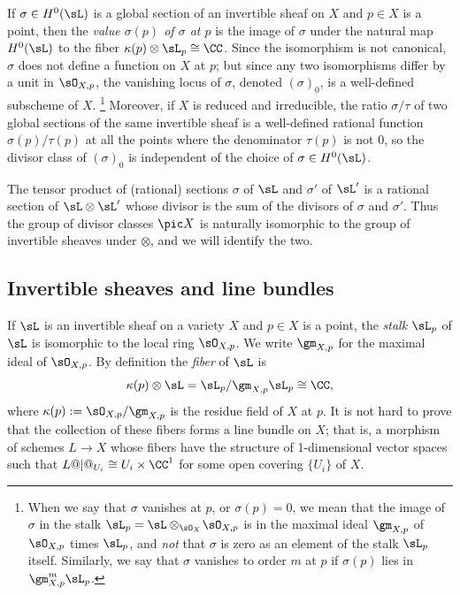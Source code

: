 If $\sigma\in H^0(\sL)$ is a global section of an invertible sheaf on
%
$X$ and $p\in X$ is a point, then the 
\emph{value $\sigma(p)$ of $\sigma$ at $p$}
is the image  of $\sigma$ under the natural map
$H^0(\sL)$ to the fiber $\kappa(p) \otimes \sL_{p} \cong \CC$. 
Since the isomorphism is not canonical, $\sigma$ does not define a function on $X$ at $p$; but since any two isomorphisms
differ by a unit in $\sO_{X,p}$, the vanishing locus of $\sigma$,
denoted $(\sigma)_0$, is a well-defined subscheme of $X$.%
%
\footnote{
When we  say that 
$\sigma$ vanishes at $p$,
or $\sigma(p) = 0$, we mean that the 
image of $\sigma$ in the stalk $\sL_p = \sL \otimes_{\sO_{X}}\!\sO_{X,p}$ is in
the maximal ideal $\gm_{X,p}$ of $\sO_{X,p}$ times $\sL_p$,
and \emph{not} that $\sigma$ is zero
as an element of the stalk $\sL_p$ itself. Similarly, we say that $\sigma$ vanishes to order $m$ at $p$ if $\sigma(p)$ lies in $\gm_{X,p}^m\sL_p$. }
%
 Moreover, if $X$ is reduced and irreducible, 
the ratio $\sigma/\tau$ of two global sections
 of the same invertible sheaf is a well-defined rational function
$\sigma(p)/\tau(p)$ at all the points where the denominator $\tau(p)$ is not 0, so the divisor class of 
$(\sigma)_0$ is independent of the choice of $\sigma \in H^0(\sL)$.

The tensor product of (rational) sections $\sigma$ of $\sL$ and $\sigma'$
of $\sL'$ is a rational section of $\sL \otimes \sL'$ 
whose divisor is
the sum of the divisors of $\sigma$ and 
$\sigma'$. Thus the group of divisor classes $\pic X$ is naturally isomorphic to the group of invertible
sheaves under $\otimes$, and we will identify the two.

\subsection*{Invertible sheaves and line bundles}

If $\sL$ is an invertible sheaf on a variety $X$ and $p\in X$ is a point, the 
%
%
%
\emph{stalk} $\sL_p$
of $\sL$ is isomorphic to the local
ring $\sO_{X,p}$. We write 
$\gm_{X,p}$
for the maximal ideal of $\sO_{X,p}$. By definition the 
\emph{fiber} 
%
of $\sL$ is 
$$
\kappa(p) \otimes \sL =\sL_p/\gm_{X,p}\sL_p\cong \CC
,
$$
where 
%
$\kappa(p) := \sO_{X,p}/\gm_{X,p}$
is the residue field of $X$ at $p$.
It is not hard to prove that the collection of these fibers forms a line bundle on $X$; that is,
%
a morphism of schemes $L \to X$ whose fibers have the structure of 1-dimensional vector spaces
such that $L@|@_{U_{i}} \cong U_{i}\times \CC^{1}$ for some open covering $\{U_{i}\}$ of $X$.


